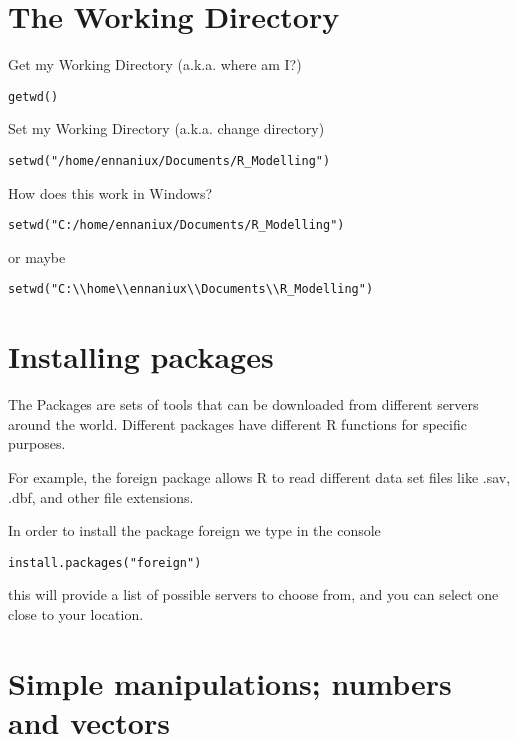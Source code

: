 \documentclass[11pt]{article}
\begin{document}
\section{The Working Directory}
\label{sec:org6b037e8}

Get my Working Directory (a.k.a. where am I?)
\begin{verbatim}
getwd()
\end{verbatim}


Set my Working Directory (a.k.a. change directory)
\begin{verbatim}
setwd("/home/ennaniux/Documents/R_Modelling")
\end{verbatim}

How does this work in Windows?
\begin{verbatim}
setwd("C:/home/ennaniux/Documents/R_Modelling")
\end{verbatim}

or maybe 
\begin{verbatim}
setwd("C:\\home\\ennaniux\\Documents\\R_Modelling")
\end{verbatim}


\section{Installing packages}
\label{sec:org4e64b8d}

The Packages are sets of tools that can be downloaded from different
servers around the world. Different packages have different R functions for specific purposes.

For example, the foreign package allows R to read different data set files like .sav, .dbf, and other file extensions.

In order to install the package foreign we type in the console
\begin{verbatim}
install.packages("foreign")
\end{verbatim}

this will provide a list of possible servers to choose from, and you
can select one close to your location.

\section{Simple manipulations; numbers and vectors}
\label{sec:orgcbc5e40}
\end{document}

